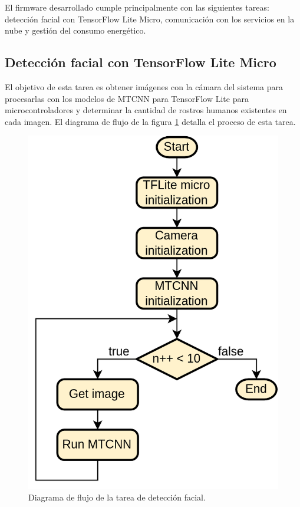 El firmware desarrollado cumple principalmente con las siguientes tareas: detección facial con TensorFlow Lite Micro, comunicación con los servicios en la nube y gestión del consumo energético.

\subsection{Detección facial con TensorFlow Lite Micro}
El objetivo de esta tarea es obtener imágenes con la cámara del sistema para procesarlas con los modelos de MTCNN para TensorFlow Lite para microcontroladores y determinar la cantidad de rostros humanos existentes en cada imagen. El diagrama de flujo de la figura \ref{fig:fw_detect_flow} detalla el proceso de esta tarea.

\begin{figure}[h]
	\centering
	\includegraphics[scale=0.22]{./Figures/fw_detection_flow.png}
	\caption{Diagrama de flujo de la tarea de detección facial.}
	\label{fig:fw_detect_flow}
\end{figure}

